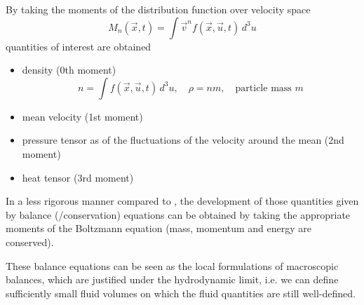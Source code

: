 By taking the moments of the distribution function over velocity space
\begin{equation}
    M_n(\vec{x},t) = \int \vec{v}^n f(\vec{x},\vec{u},t) \, d^3u
\end{equation}
quantities of interest are obtained
\begin{itemize}
    \item \textcolor{blue1}{density} (0th moment)
    \begin{equation}
         n = \int f(\vec{x},\vec{u},t) \, d^3u, \quad \rho = nm, \quad \text{particle mass } m
    \end{equation}
    \item \textcolor{blue1}{mean velocity} (1st moment)
    \item \textcolor{blue1}{pressure tensor} as of the fluctuations of the velocity around the mean (2nd moment)
    \item \textcolor{blue1}{heat tensor} (3rd moment)
\end{itemize}
In a less rigorous manner compared to \cite{deng25}, the development of those quantities given by balance (/conservation) equations can be obtained by
taking the appropriate moments of the Boltzmann equation (mass, momentum and energy are conserved).

These balance equations can be seen as the local formulations of macroscopic balances, which are justified
under the hydrodynamic limit, i.e. we can define sufficiently small fluid volumes on which the fluid
quantities are still well-defined.

